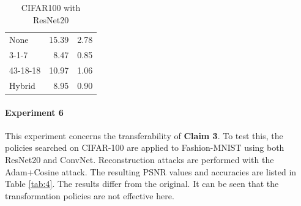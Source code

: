 \begin{table}[htb!]
\begin{minipage}{.35\linewidth}
\begin{tabular}{lrr}
            \hline
             None     &       15.39 &       2.78 \\
             3-1-7    &        8.47 &       0.85 \\
             43-18-18 &       10.97 &       1.06 \\
             Hybrid   &        8.95 &       0.90 \\
            \hline
        \end{tabular}
    \caption{CIFAR100 with ResNet20}
    \label{tab:my_label}
    \end{minipage}
    \vspace{-8mm}
\end{table}

\paragraph{Experiment 6} This experiment concerns the transferability of \textbf{Claim 3}. To test this, the policies searched on CIFAR-100 are applied to Fashion-MNIST using both ResNet20 and ConvNet. Reconstruction attacks are performed with the Adam+Cosine attack. The resulting PSNR values and accuracies are listed in Table \ref{tab:4}. The results differ from the original. It can be seen that the transformation policies are not effective here.

